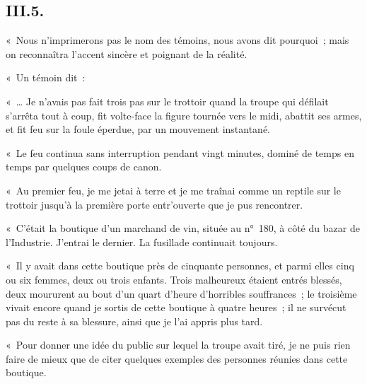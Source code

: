 \documentclass[french,twoside]{book} %
\begin{document}
\subsection[{III.5.}]{III.5.}
\noindent « Nous n’imprimerons pas le nom des témoins, nous avons dit pourquoi ; mais on reconnaîtra l’accent sincère et poignant de la réalité.\par
« Un témoin dit :\par
« … Je n’avais pas fait trois pas sur le trottoir quand la troupe qui défilait s’arrêta tout à coup, fit volte-face la figure tournée vers le midi, abattit ses armes, et fit feu sur la foule éperdue, par un mouvement instantané.\par
« Le feu continua sans interruption pendant vingt minutes, dominé de temps en temps par quelques coups de canon.\par
« Au premier feu, je me jetai à terre et je me traînai comme un reptile sur le trottoir jusqu’à la première porte entr’ouverte que je pus rencontrer.\par
« C’était la boutique d’un marchand de vin, située au n° 180, à côté du bazar de l’Industrie. J’entrai le dernier. La fusillade continuait toujours.\par
« Il y avait dans cette boutique près de cinquante personnes, et parmi elles cinq ou six femmes, deux ou trois enfants. Trois malheureux étaient entrés blessés, deux moururent au bout d’un quart d’heure d’horribles souffrances ; le troisième vivait encore quand je sortis de cette boutique à quatre heures ; il ne survécut pas du reste à sa blessure, ainsi que je l’ai appris plus tard.\par
« Pour donner une idée du public sur lequel la troupe avait tiré, je ne puis rien faire de mieux que de citer quelques exemples des personnes réunies dans cette boutique.\par
\end{document}
